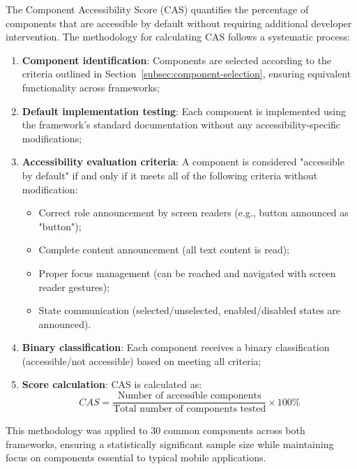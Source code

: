 The Component Accessibility Score (CAS) quantifies the percentage of components that are accessible by default without requiring additional developer intervention. The methodology for calculating CAS follows a systematic process:

\begin{enumerate}
    \item \textbf{Component identification}: Components are selected according to the criteria outlined in Section~\ref{subsec:component-selection}, ensuring equivalent functionality across frameworks;
    
    \item \textbf{Default implementation testing}: Each component is implemented using the framework's standard documentation without any accessibility-specific modifications;
    
    \item \textbf{Accessibility evaluation criteria}: A component is considered "accessible by default" if and only if it meets all of the following criteria without modification:
    \begin{itemize}
        \item Correct role announcement by screen readers (e.g., button announced as "button");
        \item Complete content announcement (all text content is read);
        \item Proper focus management (can be reached and navigated with screen reader gestures);
        \item State communication (selected/unselected, enabled/disabled states are announced).
    \end{itemize}
    
    \item \textbf{Binary classification}: Each component receives a binary classification (accessible/not accessible) based on meeting all criteria;
    
    \item \textbf{Score calculation}: CAS is calculated as:
    \begin{equation}
    CAS = \frac{\text{Number of accessible components}}{\text{Total number of components tested}} \times 100\%
    \end{equation}
\end{enumerate}

This methodology was applied to 30 common components across both frameworks, ensuring a statistically significant sample size while maintaining focus on components essential to typical mobile applications.

